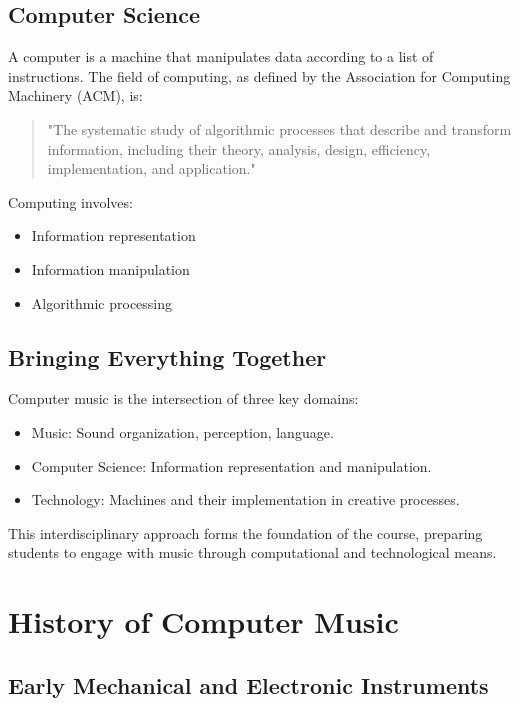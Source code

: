 \subsection{Computer Science}

A computer is a machine that manipulates data according to a list of instructions. The field of computing, as defined by the Association for Computing Machinery (ACM), is:

\begin{quote}
    "The systematic study of algorithmic processes that describe and transform information, including their theory, analysis, design, efficiency, implementation, and application."
\end{quote}

Computing involves:

\begin{itemize}
    \item Information representation
    \item Information manipulation
    \item Algorithmic processing
\end{itemize}

\subsection{Bringing Everything Together}

Computer music is the intersection of three key domains:

\begin{itemize}
    \item Music: Sound organization, perception, language.
    \item Computer Science: Information representation and manipulation.
    \item Technology: Machines and their implementation in creative processes.
\end{itemize}

This interdisciplinary approach forms the foundation of the course, preparing students to engage with music through computational and technological means.

\section{History of Computer Music}

\subsection{Early Mechanical and Electronic Instruments}

